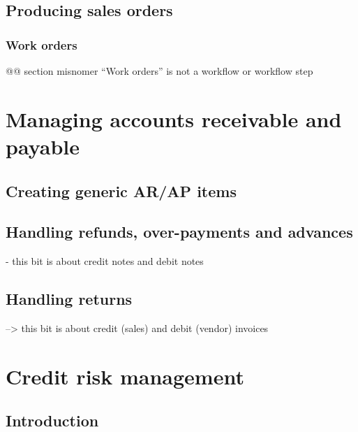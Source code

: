 \section{Producing sales orders}
\label{sec-business-processes-manufacturing-producing-orders}

\subsection{Work orders}
\label{sec-business-processes-manufacturing-work-orders}

@@ section misnomer ``Work orders'' is not a workflow or workflow step

\chapter{Managing accounts receivable and payable}
\label{cha-business-processes-managing-ar/ap}

\section{Creating generic AR/AP items}
\label{sec-business-processes-managing-ar/ap-item-creation}

\section{Handling refunds, over-payments and advances}
\label{sec-business-processes-managing-ar/ap-overpayments}

- this bit is about credit notes and debit notes

\section{Handling returns}
\label{sec-business-processes-managing-ar/ap-returns}

--> this bit is about credit (sales) and debit (vendor) invoices

\chapter{Credit risk management}
\label{cha-credit-risk-management}

\section{Introduction}
\label{sec-credit-risk-management-introduction}


